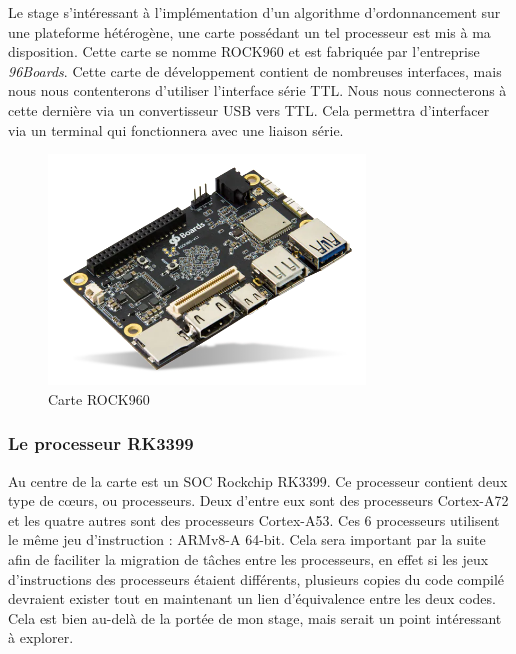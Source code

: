 Le stage s'intéressant à l'implémentation d'un algorithme d'ordonnancement sur une plateforme hétérogène, une carte possédant un tel processeur est mis à ma disposition. Cette carte se nomme ROCK960 et est fabriquée par l'entreprise \textit{96Boards}. Cette carte de développement contient de nombreuses interfaces, mais nous nous contenterons d'utiliser l'interface série TTL. Nous nous connecterons à cette dernière via un convertisseur USB vers TTL. Cela permettra d'interfacer via un terminal qui fonctionnera avec une liaison série. 

 \begin{figure}[H]
    \centering
    \includegraphics[width=0.75\textwidth]{Images/ROCK960.png}
    \caption{Carte ROCK960}
 \end{figure}



\subsubsection{Le processeur RK3399}
Au centre de la carte est un \gls{SOC} Rockchip RK3399. Ce processeur contient deux type de cœurs, ou processeurs. Deux d'entre eux sont des processeurs Cortex-A72 et les quatre autres sont des processeurs Cortex-A53. Ces 6 processeurs utilisent le même jeu d'instruction : ARMv8-A 64-bit. Cela sera important par la suite afin de faciliter la migration de tâches entre les processeurs, en effet si les jeux d'instructions des processeurs étaient différents, plusieurs copies du code compilé devraient exister tout en maintenant un lien d'équivalence entre les deux codes. Cela est bien au-delà de la portée de mon stage, mais serait un point intéressant à explorer.

